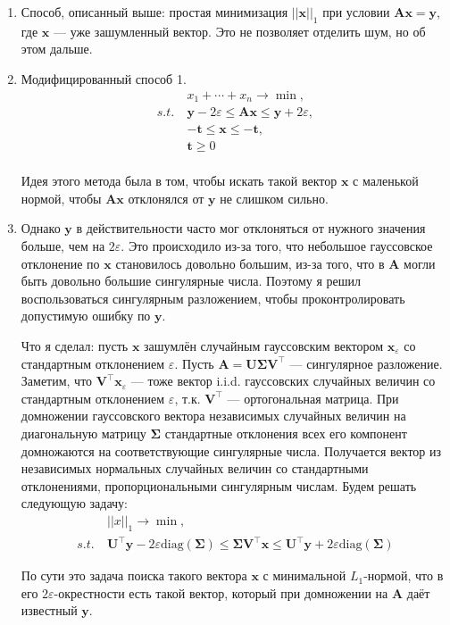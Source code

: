 \documentclass{article}
\def\*#1{\mathbf{#1}}
\begin{document}
\begin{enumerate}
	\item Способ, описанный выше: простая минимизация $||\*x||_1$ при условии $\*A \*x = \*y$, где $\*x$ --- уже зашумленный вектор. Это не позволяет отделить шум, но об этом дальше.
	\item Модифицированный способ 1. 
	\begin{align*}
    &x_1+\cdots+x_n \to \min, \\
s.t.\    &\*y - 2\varepsilon \leq \*A\*x \leq \*y + 2\varepsilon, \\
    &-\*t \leq \*x \leq -\*t, \\
    &\*t \geq 0 \\
\end{align*}

    Идея этого метода была в том, чтобы искать такой вектор $\*x$ с маленькой нормой, чтобы $\*A \*x$ отклонялся от $\*y$ не слишком сильно.
    \item Однако $\*y$ в действительности часто мог отклоняться от нужного значения больше, чем на $2 \varepsilon$. Это происходило из-за того, что небольшое гауссовское отклонение по $\*x$ становилось довольно большим, из-за того, что в $\*A$ могли быть довольно большие сингулярные числа. Поэтому я решил воспользоваться сингулярным разложением, чтобы проконтролировать допустимую ошибку по $\*y$.
    
    Что я сделал: пусть $\*x$ зашумлён случайным гауссовским вектором $\*x_\varepsilon$ со стандартным отклонением $\varepsilon$. Пусть $\*A = \*U \*\Sigma \*V^\top$ --- сингулярное разложение. Заметим, что $\*V^\top \*x_\varepsilon$ --- тоже вектор i.i.d. гауссовских случайных величин со стандартным отклонением $\varepsilon$, т.к. $\*V^\top$ --- ортогональная матрица. При домножении гауссовского вектора независимых случайных величин на диагональную матрицу $\*\Sigma$ стандартные отклонения всех его компонент домножаются на соответствующие сингулярные числа. Получается вектор из независимых нормальных случайных величин со стандартными отклонениями, пропорциональными сингулярным числам. Будем решать следующую задачу:
    \begin{align*}
    &||x||_1 \to \min, \\
s.t.\    &\*U^\top\*y - 2\varepsilon\mathrm{diag}(\*\Sigma) \leq \*\Sigma\*V^\top\*x \leq \*U^\top\*y + 2\varepsilon\mathrm{diag}(\*\Sigma)
\end{align*}

    По сути это задача поиска такого вектора $\*x$ с минимальной $L_1$-нормой, что в его $2\varepsilon$-окрестности есть такой вектор, который при домножении на $\*A$ даёт известный $\*y$.
\end{enumerate}
\end{document}
